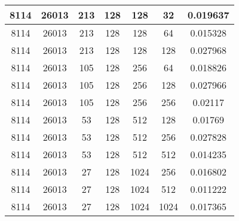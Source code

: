 \documentclass[9pt]{article}
\begin{document}
\begin{tabular}{|c|c|c|c|c|c|c| }
\hline
8114  & 26013  & 213  & 128  & 128  & 32  & 0.019637 \\
\hline
8114  & 26013  & 213  & 128  & 128  & 64  & 0.015328 \\
\hline
8114  & 26013  & 213  & 128  & 128  & 128  & 0.027968 \\
\hline
8114  & 26013  & 105  & 128  & 256  & 64  & 0.018826 \\
\hline
8114  & 26013  & 105  & 128  & 256  & 128  & 0.027966 \\
\hline
8114  & 26013  & 105  & 128  & 256  & 256  & 0.02117 \\
\hline
8114  & 26013  & 53  & 128  & 512  & 128  & 0.01769 \\
\hline
8114  & 26013  & 53  & 128  & 512  & 256  & 0.027828 \\
\hline
8114  & 26013  & 53  & 128  & 512  & 512  & 0.014235 \\
\hline
8114  & 26013  & 27  & 128  & 1024  & 256  & 0.016802 \\
\hline
8114  & 26013  & 27  & 128  & 1024  & 512  & 0.011222 \\
\hline
8114  & 26013  & 27  & 128  & 1024  & 1024  & 0.017365 \\
\hline
\end{tabular}
 
\end{document}
